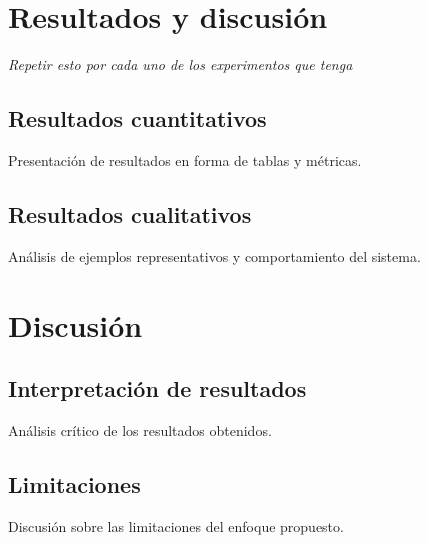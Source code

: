 \chapter{Resultados y discusión}
\textit{Repetir esto por cada uno de los experimentos que tenga}

\section{Resultados cuantitativos}
Presentación de resultados en forma de tablas y métricas.

\section{Resultados cualitativos}
Análisis de ejemplos representativos y comportamiento del sistema.
\chapter{Discusión}

\section{Interpretación de resultados}
Análisis crítico de los resultados obtenidos.

\section{Limitaciones}
Discusión sobre las limitaciones del enfoque propuesto.